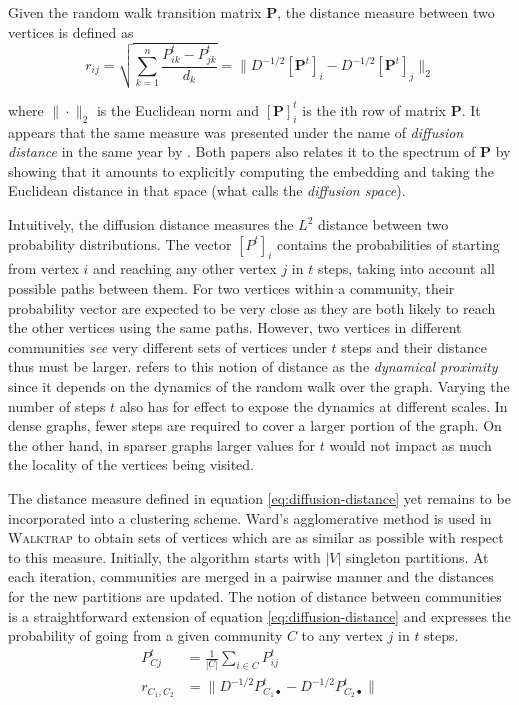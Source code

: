 Given the random walk transition matrix $\mathbf{P}$, the distance
measure between two vertices is defined as 
\begin{equation}
r_{ij} = \sqrt{\sum_{k=1}^n \frac{P_{ik}^t - P_{jk}^t}{d_k}} = \| D^{-1/2}
[\mathbf{P}^t]_i - D^{-1/2} [\mathbf{P}^t]_j \|_2
\label{eq:diffusion-distance}
\end{equation}

where $\| \cdot \|_2$ is the Euclidean norm and $[\mathbf{P}]^t_i$ is the
ith row of matrix $\mathbf{P}$. It appears that the same measure was
presented under the name of \textit{diffusion distance} in the same year
by \cite{Nadler2005}. Both papers also relates it to the spectrum of $\mathbf{P}$ by
showing that it amounts to explicitly computing the embedding and taking the Euclidean
distance in that space (what \cite{Nadler2005} calls the \textit{diffusion space}).
 
Intuitively, the diffusion distance measures the $L^2$ distance between two probability
distributions. The vector $[P^t]_i$ contains the probabilities of starting from vertex $i$
and reaching any other vertex $j$ in $t$ steps, taking into account all possible paths 
between them. For two vertices within a community, their probability vector are
expected to be very close as they are both likely to reach the other vertices using the
same paths. However, two vertices in different communities \textit{see} very different
sets of vertices under $t$ steps and their distance thus must be larger. \cite{Nadler2005} refers to this notion of distance as the \textit{dynamical proximity} since it depends on the dynamics of the random walk over the graph. Varying the number of steps $t$ also has for effect to expose the dynamics at different scales. In dense graphs, fewer steps are required to cover a larger portion of the graph. On the other hand, in sparser graphs larger values for $t$ would not impact as much the locality of the vertices being visited. 

The distance measure defined in equation \ref{eq:diffusion-distance} yet remains to be incorporated into a clustering scheme. Ward's agglomerative method \parencite{Ward1963} is used in \textsc{Walktrap} to obtain sets of vertices which are as similar as possible with respect to this measure. Initially, the algorithm starts with $|V|$ singleton partitions.  At each iteration, communities are merged in a pairwise manner and the distances for the new partitions are updated. The notion of distance between communities is a straightforward extension of equation \ref{eq:diffusion-distance} and expresses the probability of going from a given community $C$ to any vertex $j$ in $t$ steps.  \label{sec:walktrap}
\begin{align}
P^t_{Cj} &= \frac{1}{|C|} \sum_{i \in C} P^t_{ij} \\
r_{C_1, C_2} &= \| D^{-1/2} P_{C_1 \bullet}^t - D^{-1/2} P_{C_2 \bullet}^t\|
\end{align}

